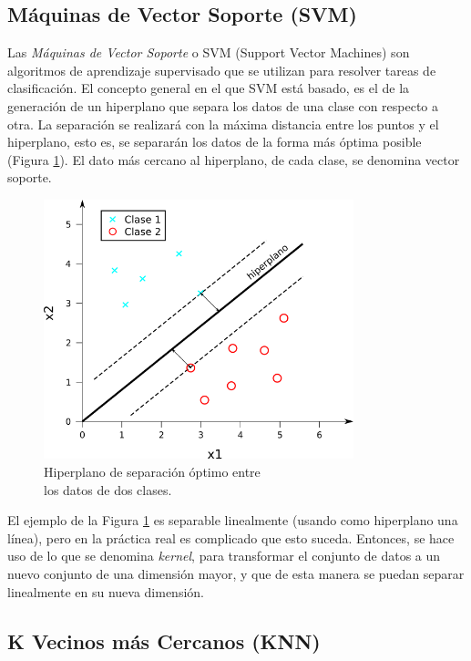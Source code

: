 \subsection{Máquinas de Vector Soporte (SVM)}

Las \textit{Máquinas de Vector Soporte} o SVM (Support Vector Machines) son algoritmos de aprendizaje supervisado que se utilizan para resolver tareas de clasificación. El concepto general en el que SVM está basado, es el de la generación de un hiperplano que separa los datos de una clase con respecto a otra. La separación se realizará con la máxima distancia entre los puntos y el hiperplano, esto es, se separarán los datos de la forma más óptima posible (Figura \ref{fig:svm_hiperplano}). El dato más cercano al hiperplano, de cada clase, se denomina vector soporte.\\

\begin{figure} [h!]
  \begin{center}
    \includegraphics[width=9cm]{figs/svm_hiperplano.png}
  \end{center}
  \caption{Hiperplano de separación óptimo entre\\
            los datos de dos clases.}
  \label{fig:svm_hiperplano}
\end{figure}

El ejemplo de la Figura \ref{fig:svm_hiperplano} es separable linealmente (usando como hiperplano una línea), pero en la práctica real es complicado que esto suceda. Entonces, se hace uso de lo que se denomina \textit{kernel}, para transformar el conjunto de datos a un nuevo conjunto de una dimensión mayor, y que de esta manera se puedan separar linealmente en su nueva dimensión.

\subsection{K Vecinos más Cercanos (KNN)}

